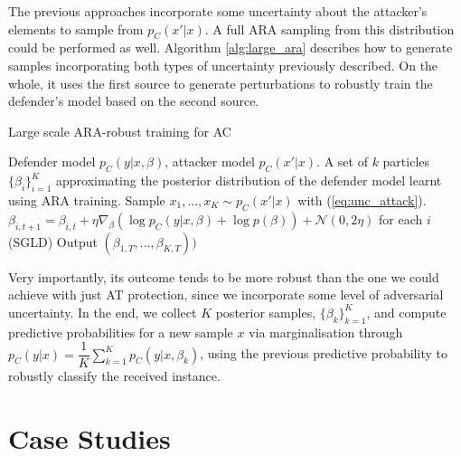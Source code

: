 The previous approaches incorporate some uncertainty about the attacker's elements to sample from $p_C(x' \vert x)$. A full ARA sampling from this distribution could be performed as well. 
Algorithm \ref{alg:large_ara} describes how to generate samples incorporating both types of uncertainty previously described. On the whole, it uses the first source to generate perturbations to robustly train the defender's model based on the second source. 


\begin{algorithm}[!ht] %
\caption{Large scale ARA-robust training for AC}  
\label{alg:large_ara}
\begin{algorithmic}[1]
 Defender model $p_C(y|x,\beta)$, attacker model $p_C(x'|x)$. 
 A set of $k$ particles $\{\beta_i\}_{i=1}^{K}$  approximating the posterior distribution of the defender model learnt using ARA training.  
\State Sample $x_1, \ldots,  x_K \sim p_C(x' | x)$ with 
(\ref{eq:unc_attack}).
\State $\beta_{i,t+1} = \beta_{i,t} + \eta \nabla_\beta (\log p_C(y|x, \beta) + \log p(\beta)) + \mathcal{N}(0, 2\eta )$ for each $i$ (SGLD)
\EndFor
\State Output $(\beta_{1,T},...,\beta_{K,T}))$
\end{algorithmic}
\end{algorithm}

Very importantly, its outcome tends to be more robust  than
the one we could achieve with just AT protection, since we incorporate some level of adversarial uncertainty. In the end, we collect $K$ posterior samples, $\lbrace \beta_k \rbrace_{k=1}^K$, and compute predictive probabilities for a new sample $x$ via marginalisation
through
$p_C(y|x) = \dfrac{1}{K} \sum_{k=1}^K p_C(y|x, \beta_k)$,
using the previous predictive probability to robustly classify the
received instance.


 




\section{Case Studies}
\label{sec:conEx}

